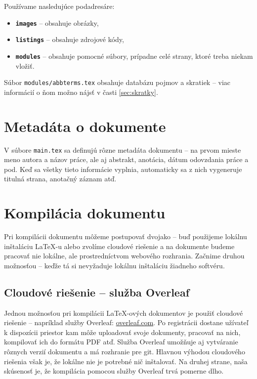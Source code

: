 Používame nasledujúce podadresáre:
\begin{itemize}
\item \textbf{\texttt{images}} -- obsahuje obrázky,
\item \textbf{\texttt{listings}} -- obsahuje zdrojové kódy,
\item \textbf{\texttt{modules}} -- obsahuje pomocné súbory, prípadne celé strany, ktoré treba niekam vložiť.
\end{itemize}

Súbor \texttt{modules/abbterms.tex} obsahuje databázu pojmov a skratiek -- viac informácií o ňom možno nájsť v časti \ref{sec:skratky}.

\section{Metadáta o dokumente}

V súbore \texttt{main.tex} sa definujú rôzne metadáta dokumentu -- na prvom mieste meno autora a názov práce, ale aj abstrakt, anotácia, dátum odovzdania práce a pod. Keď sa všetky tieto informácie vyplnia, automaticky sa z nich vygeneruje titulná strana, anotačný záznam atď.

\section{Kompilácia dokumentu}

Pri kompilácii dokumentu môžeme postupovať dvojako -- buď použijeme lokálnu inštaláciu LaTeX-u alebo zvolíme cloudové riešenie a na dokumente budeme pracovať nie lokálne, ale prostredníctvom webového rozhrania. Začnime druhou možnosťou -- keďže tá si nevyžaduje lokálnu inštaláciu žiadneho softvéru.

\subsection{Cloudové riešenie -- služba Overleaf}

Jednou možnosťou pri kompilácii LaTeX-ových dokumentov je použiť cloudové riešenie -- napríklad služby Overleaf: \href{https://www.overleaf.com/}{overleaf.com}. Po registrácii dostane užívateľ k dispozícii priestor kam môže uploadovať svoje dokumenty, pracovať na nich, kompilovať ich do formátu PDF atď. Služba Overleaf umožňuje aj vytváranie rôznych verzií dokumentu a má rozhranie pre git. Hlavnou výhodou cloudového riešenia však je, že lokálne nie je potrebné nič inštalovať. Na druhej strane, naša skúsenosť je, že kompilácia pomocou služby Overleaf trvá pomerne dlho.

